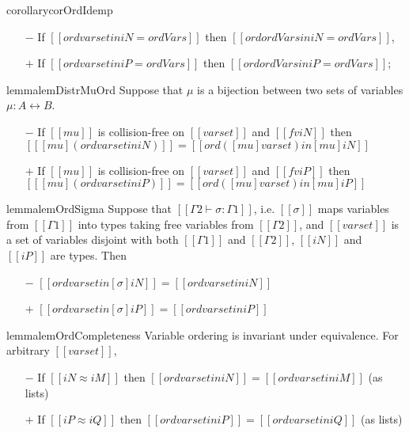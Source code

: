 \begin{restatable}{corollary}{corOrdIdemp}
  \label{corollary:ord-idemp}
  \hfill
  \begin{itemize}
    \item[$-$] If $[[ ord varset in iN = ordVars ]]$ then 
      $[[ ord {ordVars} in iN = ordVars ]]$,
    \item[$+$] If $[[ ord varset in iP = ordVars ]]$ then 
      $[[ ord {ordVars} in iP = ordVars ]]$;
  \end{itemize}
\end{restatable}

\begin{restatable}{lemma}{lemDistrMuOrd}
  \label{lemma:distr-mu-ord}
  Suppose that $\mu$ is a bijection between two sets of variables
  $\mu : A \leftrightarrow B$.
  
  \begin{itemize}
  \item[$-$]
    If $[[mu]]$ is collision-free on $[[varset]]$ and $[[fv iN]]$ then
    $[[ [mu] (ord varset in iN) ]] = [[ord ([mu] varset) in [mu] iN ]]$
  \item[$+$]
    If $[[mu]]$ is collision-free on $[[varset]]$ and $[[fv iP]]$ then
    $[[ [mu] (ord varset in iP) ]] = [[ord ([mu] varset) in [mu] iP ]]$
  \end{itemize}
\end{restatable}

\begin{restatable}{lemma}{lemOrdSigma}
    \label{lemma:ord-sigma}
    Suppose that $[[Γ2 ⊢ σ : Γ1]]$, i.e. $[[σ]]$ maps variables from $[[Γ1]]$ into types
    taking free variables from $[[Γ2]]$, and $[[varset]]$ is a set of variables
    disjoint with both $[[Γ1]]$ and $[[Γ2]]$, 
    $[[iN]]$ and $[[iP]]$ are types. Then
        \begin{itemize}
    \item[$-$] $[[ ord varset in [σ]iN ]] = [[ord varset in iN ]]$
    \item[$+$] $[[ ord varset in [σ]iP ]] = [[ord varset in iP ]]$
    \end{itemize}
\end{restatable}

\begin{restatable}{lemma}{lemOrdCompleteness}
    \label{lemma:ord-completeness}
    Variable ordering is invariant under equivalence. For arbitrary $[[varset]]$,
     \begin{itemize}
    \item[$-$] If $[[iN ≈ iM]]$ then $[[ord varset in iN]] = [[ord varset in iM]]$ (as lists)
    \item[$+$] If $[[iP ≈ iQ]]$ then $[[ord varset in iP]] = [[ord varset in iQ]]$ (as lists)
    \end{itemize}
\end{restatable}
